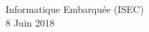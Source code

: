 \begin{titlepage}

{\large Informatique Embarquée (ISEC)}\\[10pt]


{\large 8 Juin 2018}\\[2cm] %


 

\vfill %

\end{titlepage}


%
%
%
%
%    
%
%
